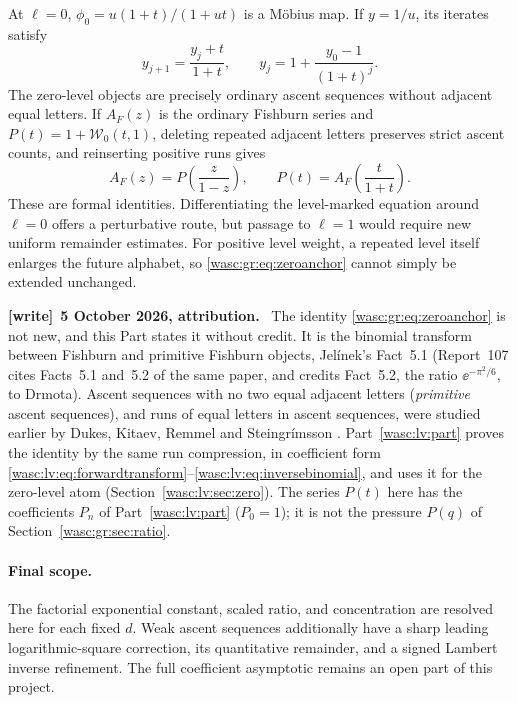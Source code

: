 \documentclass[11pt,a4paper]{article}
\theoremstyle{remark}\newtheorem{remark}[theorem]{Remark}
\numberwithin{equation}{section}
\newenvironment{writenote}[1][]{\par\smallskip\begingroup\small
 \noindent\textbf{[write]}\if\relax\detokenize{#1}\relax\else~\textbf{#1.}\fi\ }%
 {\par\endgroup\smallskip}
\begin{document}
At $\ell=0$, $\phi_0=u(1+t)/(1+ut)$ is a M\"obius map. If $y=1/u$, its iterates satisfy
\[
y_{j+1}=\frac{y_j+t}{1+t},\qquad
y_j=1+\frac{y_0-1}{(1+t)^j}.
\]
The zero-level objects are precisely ordinary ascent sequences without adjacent equal letters. If $A_F(z)$ is the ordinary Fishburn series and $P(t)=1+\mathcal W_0(t,1)$, deleting repeated adjacent letters preserves strict ascent counts, and reinserting positive runs gives
\begin{equation}\label{wasc:gr:eq:zeroanchor}
A_F(z)=P\!\left(\frac z{1-z}\right),\qquad
P(t)=A_F\!\left(\frac t{1+t}\right).
\end{equation}
These are formal identities. Differentiating the level-marked equation around $\ell=0$ offers a perturbative route, but passage to $\ell=1$ would require new uniform remainder estimates. For positive level weight, a repeated level itself enlarges the future alphabet, so \eqref{wasc:gr:eq:zeroanchor} cannot simply be extended unchanged.
\begin{writenote}[5 October 2026, attribution]
The identity \eqref{wasc:gr:eq:zeroanchor} is not new, and this Part states it without credit. It is the binomial transform between Fishburn and primitive Fishburn objects, Jel\'inek's Fact~5.1 \cite{jelinek} (Report~107 cites Facts~5.1 and~5.2 of the same paper, and credits Fact~5.2, the ratio $\ee^{-\pi^2/6}$, to Drmota). Ascent sequences with no two equal adjacent letters (\emph{primitive} ascent sequences), and runs of equal letters in ascent sequences, were studied earlier by Dukes, Kitaev, Remmel and Steingr\'imsson \cite{dkrs}. Part~\ref{wasc:lv:part} proves the identity by the same run compression, in coefficient form \eqref{wasc:lv:eq:forwardtransform}--\eqref{wasc:lv:eq:inversebinomial}, and uses it for the zero-level atom (Section~\ref{wasc:lv:sec:zero}). The series $P(t)$ here has the coefficients $P_n$ of Part~\ref{wasc:lv:part} ($P_0=1$); it is not the pressure $P(q)$ of Section~\ref{wasc:gr:sec:ratio}.
\end{writenote}

\paragraph{Final scope.}
The factorial exponential constant, scaled ratio, and concentration are resolved here for each fixed $d$. Weak ascent sequences additionally have a sharp leading logarithmic-square correction, its quantitative remainder, and a signed Lambert inverse refinement. The full coefficient asymptotic remains an open part of this project.
\end{document}
